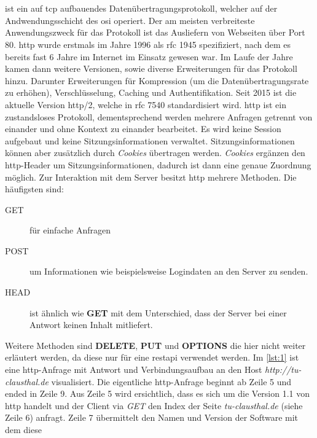 \documentclass[titlepage]{report}
\begin{document}
\section*{}
 ist ein auf \gls{tcp} aufbauendes
Datenübertragungsprotokoll, welcher auf der Andwendungsschicht des
\gls{osi} operiert. Der am meisten verbreiteste Anwendungszweck für das
Protokoll ist das Ausliefern von Webseiten über Port 80. \gls{http}
wurde erstmals im Jahre 1996 als \gls{rfc} 1945 spezifiziert, nach dem
es bereits fast 6 Jahre im Internet im Einsatz gewesen
war\cite{RFC1945}. Im Laufe der Jahre kamen dann weitere Versionen,
sowie diverse Erweiterungen für das Protokoll hinzu. Darunter
Erweiterungen für Kompression (um die Datenübertragungsrate zu erhöhen),
Verschlüsselung, Caching und Authentifikation. Seit 2015 ist die
aktuelle Version \gls{http}/2, welche in \gls{rfc} 7540 standardisiert
wird\cite{RFC7540}. \gls{http} ist ein zustandsloses Protokoll,
dementsprechend werden mehrere Anfragen getrennt von einander und ohne
Kontext zu einander bearbeitet. Es wird keine Session aufgebaut und
keine Sitzungsinformationen verwaltet. Sitzungsinformationen können
aber zusätzlich durch \emph{Cookies} übertragen werden. \emph{Cookies}
ergänzen den \gls{http}\hyp{}Header um Sitzungsinformationen, dadurch
ist dann eine genaue Zuordnung möglich. Zur Interaktion mit dem Server
besitzt \gls{http} mehrere Methoden. Die häufigsten sind:
\begin{description}
    \item[GET] für einfache Anfragen
    \item[POST] um Informationen wie beispielsweise Logindaten an den
        Server zu senden.
    \item[HEAD] ist ähnlich wie \textbf{GET} mit dem Unterschied, dass
        der Server bei einer Antwort keinen Inhalt mitliefert.
\end{description}
Weitere Methoden sind \textbf{DELETE}, \textbf{PUT} und \textbf{OPTIONS}
die hier nicht weiter erläutert werden, da diese nur für eine
\gls{restapi} verwendet werden.
Im \autoref{lst:1} ist eine \gls{http}\hyp{}Anfrage mit Antwort und
Verbindungsaufbau an den Host \emph{http://tu-clausthal.de}
visualisiert. Die eigentliche \gls{http}\hyp{}Anfrage beginnt ab Zeile 5
und ended in Zeile 9. Aus Zeile 5 wird ersichtlich, dass es sich um die
Version 1.1 von \gls{http} handelt und der Client via \emph{GET} den
Index der Seite \emph{tu-clausthal.de} (siehe Zeile 6) anfragt. Zeile 7
übermittelt den Namen und Version der Software mit dem diese
\end{document}
